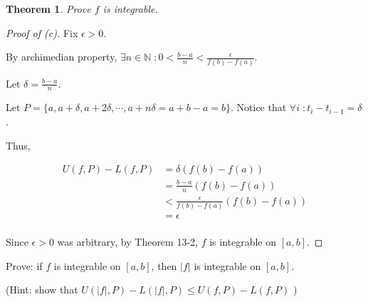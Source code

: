 \documentclass{article} %
\theoremstyle{plain}
\newtheorem*{theorem*}{Theorem}
\theoremstyle{definition}
\newcommand{\abs}[1]{\left\lvert #1 \right\rvert} %
\begin{document}
\begin{theorem*}
    Prove $f$ is integrable.
\end{theorem*}
\begin{proof}[Proof of (c)]
    Fix $\epsilon > 0$.

    By archimedian property, $\exists n \in \mathbb{N} \; \colon 0 < \frac{b-a}{n} < \frac{\epsilon}{f(b) - f(a)}$.

    Let $\delta = \frac{b-a}{n}$.

    Let $P = \{a, a + \delta, a + 2 \delta, \cdots, a + n \delta = a + b - a = b\}$.  Notice that $\forall i \; \colon t_i - t_{i-1} = \delta$.

    Thus,
    
    \begin{align*}
        U(f,P) - L(f,P) & = \delta (f(b) - f(a)) \\
        &= \frac{b-a}{n} (f(b) - f(a)) \\
        &< \frac{\epsilon}{f(b) - f(a)} (f(b) - f(a)) \\
        &= \epsilon \\
    \end{align*}

    Since $\epsilon > 0$ was arbitrary, by Theorem 13-2, $f$ is integrable on $[a,b]$.
\end{proof}


\noindent{} Prove: if $f$ is integrable on $[a,b]$, then $\abs{f}$ is integrable on $[a,b]$.

(Hint: show that $U(\abs{f},P)-L(\abs{f},P) \leq U(f,P)-L(f,P)$ )
\end{document}
